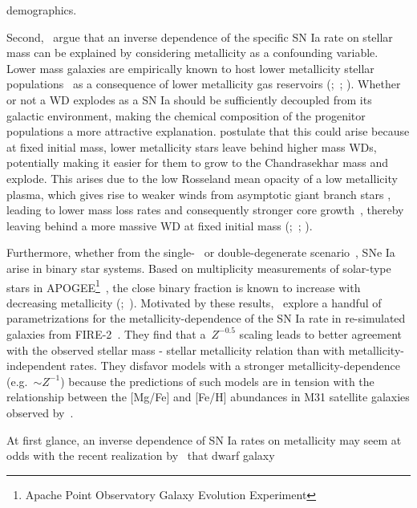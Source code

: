 \documentclass[ms.tex]{subfiles}
\begin{document}
demographics.
\par
Second,~\citet{Kistler2013} argue that an inverse dependence of the
specific SN Ia rate on stellar mass can be explained by considering metallicity
as a confounding variable.
Lower mass galaxies are empirically known to host lower metallicity stellar
populations~\citep{Gallazzi2005, Kirby2013} as a consequence of lower
metallicity gas reservoirs (\citealp{Tremonti2004};~\citealp*{Zahid2011};
\citealp{Andrews2013, Zahid2014}).
Whether or not a WD explodes as a SN Ia should be sufficiently decoupled from
its galactic environment, making the chemical composition of the progenitor
populations a more attractive explanation.
\citet{Kistler2013} postulate that this could arise because at fixed initial
mass, lower metallicity stars leave behind higher mass WDs, potentially making
it easier for them to grow to the Chandrasekhar mass and explode.
This arises due to the low Rosseland mean opacity of a low metallicity plasma,
which gives rise to weaker winds from asymptotic giant branch stars
\citep{Willson2000, Marigo2007}, leading to lower mass loss rates and
consequently stronger core growth~\citep{Kalirai2014}, thereby leaving behind a
more massive WD at fixed initial mass (\citealp{Umeda1999};~\citealp*{Meng2008};
\citealp{Zhao2012}).
\par
Furthermore, whether from the single-~\citep[e.g.][]{Whelan1973} or
double-degenerate scenario~\citep[e.g.][]{Iben1984, Webbink1984}, SNe Ia arise
in binary star systems.
Based on multiplicity measurements of solar-type stars in APOGEE\footnote{
	Apache Point Observatory Galaxy Evolution Experiment
}~\citep{Majewski2017}, the close binary fraction is known to increase with
decreasing metallicity (\citealp{Badenes2018};~\citealp*{Moe2019}).
Motivated by these results,~\citet{Gandhi2022} explore a handful of
parametrizations for the metallicity-dependence of the SN Ia rate in
re-simulated galaxies from FIRE-2~\citep{Hopkins2018}.
They find that a~$Z^{-0.5}$ scaling leads to better agreement with the observed
stellar mass - stellar metallicity relation than with metallicity-independent
rates.
They disfavor models with a stronger metallicity-dependence (e.g.~$\sim Z^{-1}$)
because the predictions of such models are in tension with the relationship
between the [Mg/Fe] and [Fe/H] abundances in M31 satellite galaxies observed
by~\citet*{Vargas2014}.
\par
At first glance, an inverse dependence of SN Ia rates on metallicity may seem
at odds with the recent realization by~\citet{Holoien2022} that dwarf galaxy
\end{document}

